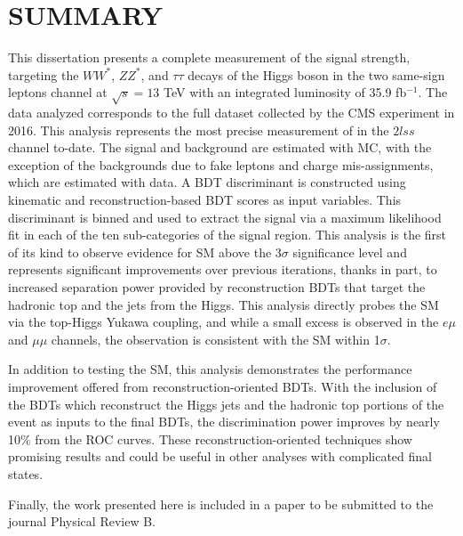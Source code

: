 %
%

\chapter{SUMMARY}
\label{chap:summary}
This dissertation presents a complete measurement of the \tth signal strength, targeting the $WW^{*}$, $ZZ^{*}$, and $\tau\tau$ decays of the Higgs boson
in the two same-sign leptons channel at $\sqrt{s} = 13$ TeV with an integrated luminosity of 35.9 fb$^{-1}$.
The data analyzed corresponds to the full dataset collected by the CMS experiment in 2016.
This analysis represents the most precise measurement of \tth in the $2lss$ channel to-date.
The signal and background are estimated with MC, with the exception of the backgrounds due to fake leptons and charge mis-assignments,
which are estimated with data. A BDT discriminant is constructed using kinematic and reconstruction-based BDT scores as input variables.
This discriminant is binned and used to extract the signal via a maximum likelihood fit in each of the ten sub-categories of the signal region.
This analysis is the first of its kind to observe evidence for SM \tth above the 3$\sigma$ significance level and represents significant
improvements over previous iterations, thanks in part, to increased separation power provided by reconstruction BDTs that target the hadronic top
and the jets from the Higgs. This analysis directly probes the SM via the top-Higgs Yukawa coupling, and while a small excess is observed
in the $e\mu$ and $\mu\mu$ channels, the observation is consistent with the SM within 1$\sigma$. 

In addition to testing the SM, this analysis demonstrates the performance improvement offered from reconstruction-oriented BDTs. With the inclusion of the BDTs
which reconstruct the Higgs jets and the hadronic top portions of the \tth event as inputs to the final BDTs,
the discrimination power improves by nearly 10$\%$ from the ROC curves. These reconstruction-oriented techniques show promising results and could be useful
in other analyses with complicated final states.

Finally, the work presented here is included in a paper to be submitted to the journal Physical Review B. 
